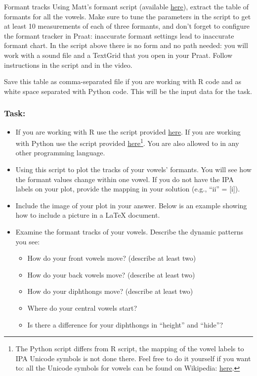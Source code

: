 \documentclass{../labbook}
\begin{document}
\begin{problem}{1}{10}{Formant tracks}
Using Matt's formant script (available \href{https://github.com/ListenLab/make_vowel_space/blob/main/Extract_formants.txt}{here}), extract the table of formants for all the vowels. Make sure to tune the parameters in the script to get at least 10 measurements of each of three formants, and don't forget to configure the formant tracker in Praat: inaccurate formant settings lead to inaccurate formant chart. In the script above there is no form and no path needed: you will work with a sound file and a TextGrid that you open in your Praat. Follow instructions in the script and in the video.

Save this table as comma-separated file if you are working with R code and as white space separated with Python code. This will be the input data for the task.

\subsubsection*{Task:}
\begin{itemize}
    \item If you are working with R use the script provided \href{https://github.com/ListenLab/make_vowel_space/blob/main/Plot_vowel_space.R}{here}. If you are working with Python use the script provided \href{https://github.com/Equidamoid/vowel_space_plot}{here}\footnote{The Python script differs from R script,  the mapping of the vowel labels to IPA Unicode symbols is not done there. Feel free to do it yourself if you want to: all the Unicode symbols for vowels can be found on Wikipedia: \href{https://en.wikipedia.org/wiki/Phonetic_symbols_in_Unicode\#Vowels}{here}.}. You are also allowed to in any other programming language.
    
    \item Using this script to plot the tracks of your vowels' formants. You will see how the formant values change within one vowel. If you do not have the IPA labels on your plot, provide the mapping in your solution (e.g., ``ii'' = [i]).
    
    \item Include the image of your plot in your answer. Below is an example showing how to include a picture in a LaTeX document. 

    \item Examine the formant tracks of your vowels. Describe the dynamic patterns you see:
    \begin{itemize}
        \item How do your front vowels move? (describe at least two)
        \item How do your back vowels move? (describe at least two)
        \item How do your diphthongs move? (describe at least two)
        \item Where do your central vowels start?
        \item Is there a difference for your diphthongs in ``height'' and ``hide''? 
    \end{itemize} 
   
\end{itemize}

\end{problem}
\end{document}
